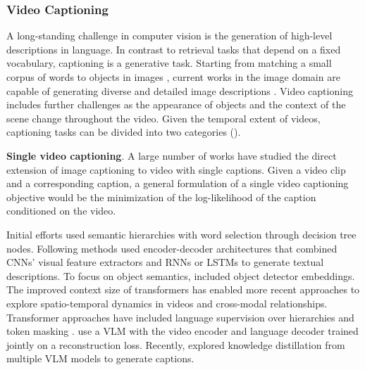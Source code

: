 \subsubsection{Video Captioning} 

A long-standing challenge in computer vision is the generation of high-level descriptions in language. In contrast to retrieval tasks that depend on a fixed vocabulary, captioning is a generative task. Starting from matching a small corpus of words to objects in images \citep{barnard2001learning,barnard2003matching}, current works in the image domain are capable of generating diverse and detailed image descriptions \citep{mokady2021clipcap,alayrac2022flamingo}. Video captioning includes further challenges as the appearance of objects and the context of the scene change throughout the video. Given the temporal extent of videos, captioning tasks can be divided into two categories ().

\noindent
\textbf{Single video captioning}. A large number of works have studied the direct extension of image captioning to video with single captions.  
Given a video clip and a corresponding caption, a general formulation of a single video captioning objective would be the minimization of the log-likelihood of the caption conditioned on the video.



Initial efforts \citep{guadarrama2013youtube2text} used semantic hierarchies with word selection through decision tree nodes. Following methods \citep{aafaq2019spatio,chen2017generating,gan2017semantic,pan2017video,wang2018reconstruction} used encoder-decoder architectures that combined CNNs' visual feature extractors and RNNs or LSTMs to generate textual descriptions. To focus on object semantics, \citet{aafaq2019spatio,zheng2020syntax} included object detector embeddings. The improved context size of transformers has enabled more recent approaches to explore spatio-temporal dynamics in videos and cross-modal relationships. Transformer approaches have included language supervision over hierarchies \citep{ye2022hierarchical} and token masking \citep{lin2022swinbert,shen2023accurate,yan2023prompt}. \citet{seo2022end} use a VLM with the video encoder and language decoder trained jointly on a reconstruction loss. Recently, \citet{chen2024panda} explored knowledge distillation from multiple VLM models to generate captions.


